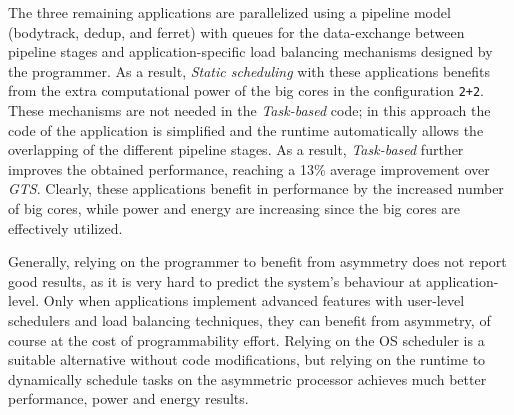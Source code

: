The three remaining applications are parallelized using a pipeline model (bodytrack, dedup, and ferret)  with queues for the data-exchange between pipeline stages and application-specific load balancing mechanisms designed by the programmer. As a result, \emph{Static scheduling} with these applications benefits from the extra computational power of the big cores in the configuration \texttt{2+2}. These mechanisms are not needed in the \emph{Task-based} code; in this approach the code of the application is simplified and the runtime automatically allows the overlapping of the different pipeline stages. As a result, \emph{Task-based} further improves the obtained performance, reaching a 13\% average improvement over \emph{GTS}. Clearly, these applications benefit in performance by the increased number of big cores, while power and energy are increasing since the big cores are effectively utilized.



Generally, relying on the programmer to benefit from asymmetry does not report good results, as it 
is very hard to predict the system's behaviour at application-level. Only when applications 
implement advanced features with user-level schedulers and load balancing techniques, they can 
benefit from asymmetry, of course at the cost of programmability effort. Relying on the OS 
scheduler is a suitable alternative without code modifications, but relying on the runtime to 
dynamically schedule tasks on the asymmetric processor achieves much better performance, power and 
energy results.



